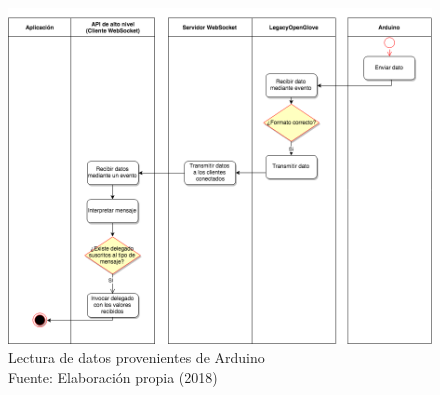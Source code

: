 \begin{figure}[H]
  \begin{center} 
   	\includegraphics[width=1.0\textwidth]{images/chapter04/ActivityDiagrams-ReadDataFromArduino.png} 
   	\captionsetup{justification=centering}
    \caption[Lectura de datos provenientes de Arduino]{Lectura de datos provenientes de Arduino \\Fuente: Elaboración propia (2018)}
    \label{fig:activity-diagrams-4-ReadDataFromArduino}
  \end{center}
\end{figure}